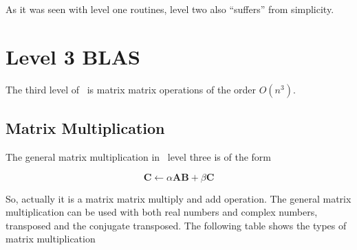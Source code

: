 As it was seen with level one routines, level two also ``suffers''
from simplicity.

\section{Level 3 BLAS}

The third level of \BLAS\ is matrix matrix operations of the order
$O(n^3)$.

\subsection{Matrix Multiplication}

The general matrix multiplication in \BLAS\ level three is of the form

\[
\mathbf{C} \gets \alpha \mathbf{A} \mathbf{B} + \beta \mathbf{C}
\]

So, actually it is a matrix matrix multiply and add operation. The
general matrix multiplication can be used with both real numbers and
complex numbers, transposed and the conjugate transposed. The
following table shows the types of matrix multiplication

